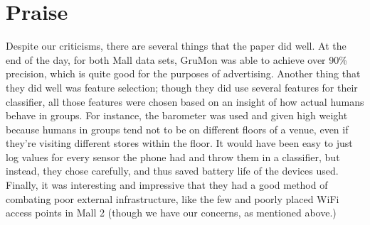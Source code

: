 \documentclass[a4paper]{article}
\begin{document}
\section{Praise}
Despite our criticisms, there are several things that the paper did well. At the
end of the day, for both Mall data sets, GruMon was able to achieve over 90\%
precision, which is quite good for the purposes of advertising. Another thing
that they did well was feature selection; though they did use several features
for their classifier, all those features were chosen based on an insight of how
actual humans behave in groups. For instance, the barometer was used and given
high weight because humans in groups tend not to be on different floors of a
venue, even if they're visiting different stores within the floor. It would have
been easy to just log values for every sensor the phone had and throw them in a
classifier, but instead, they chose carefully, and thus saved battery life of
the devices used. Finally, it was interesting and impressive that they had a
good method of combating poor external infrastructure, like the few and poorly
placed WiFi access points in Mall 2 (though we have our concerns, as mentioned
above.)
\end{document}
